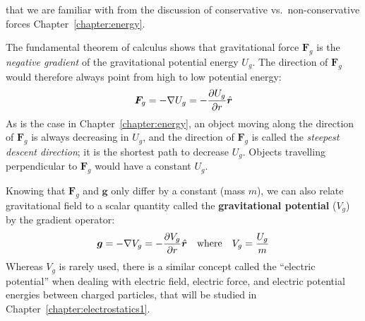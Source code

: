 that we are familiar with from the discussion of conservative vs.\
non-conservative forces Chapter~\ref{chapter:energy}.

The fundamental theorem of calculus shows that gravitational force
$\bm F_g$ is the \emph{negative gradient} of the gravitational potential
energy $U_g$. The direction of $\bm F_g$ would therefore always point from
high to low potential energy: %
\begin{equation}
  \bm F_g = -\nabla U_g = -\diffp{U_g}r\hat{\bm r}
\end{equation}
As is the case in Chapter~\ref{chapter:energy}, an object moving along the
direction of $\bm F_g$ is always decreasing in $U_g$, and the direction of
$\bm F_g$ is called the \emph{steepest descent direction}; it is the shortest
path to decrease $U_g$. Objects travelling perpendicular to $\bm F_g$ would
have a constant $U_g$.

Knowing that $\bm F_g$ and $\bm g$ only differ by a constant (mass $m$), we
can also relate gravitational field to a scalar quantity called the
\textbf{gravitational potential} ($V_g$) by the gradient operator:
\begin{equation}
  \bm g=-\nabla V_g=-\diffp{V_g}r\hat{\bm r}
  \quad\text{where}\quad
  V_g=\frac{U_g}m
\end{equation}
Whereas $V_g$ is rarely used, there is a similar concept called the
``electric potential'' when dealing with electric field, electric force, and
electric potential energies between charged particles, that will be studied in
Chapter~\ref{chapter:electrostatics1}.

